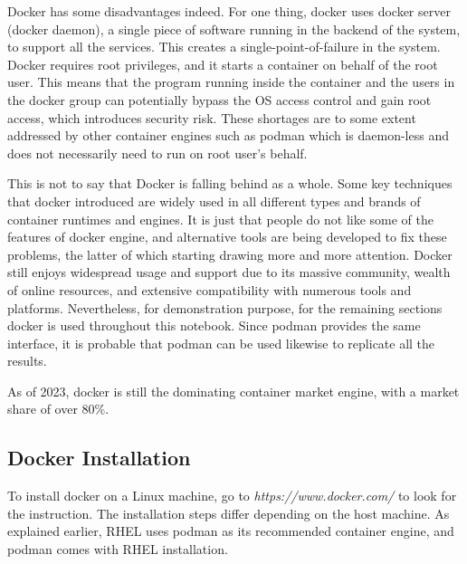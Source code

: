 Docker has some disadvantages indeed. For one thing, docker uses docker server (docker daemon), a single piece of software running in the backend of the system, to support all the services. This creates a single-point-of-failure in the system. Docker requires root privileges, and it starts a container on behalf of the root user. This means that the program running inside the container and the users in the docker group can potentially bypass the OS access control and gain root access, which introduces security risk. These shortages are to some extent addressed by other container engines such as podman which is daemon-less and does not necessarily need to run on root user's behalf.

This is not to say that Docker is falling behind as a whole. Some key techniques that docker introduced are widely used in all different types and brands of container runtimes and engines. It is just that people do not like some of the features of docker engine, and alternative tools are being developed to fix these problems, the latter of which starting drawing more and more attention. Docker still enjoys widespread usage and support due to its massive community, wealth of online resources, and extensive compatibility with numerous tools and platforms. Nevertheless, for demonstration purpose, for the remaining sections docker is used throughout this notebook. Since podman provides the same interface, it is probable that podman can be used likewise to replicate all the results.

As of 2023, docker is still the dominating container market engine, with a market share of over $80\%$.

\subsection{Docker Installation}

To install docker on a Linux machine, go to \textit{https://www.docker.com/} to look for the instruction. The installation steps differ depending on the host machine. As explained earlier, RHEL uses podman as its recommended container engine, and podman comes with RHEL installation. 

